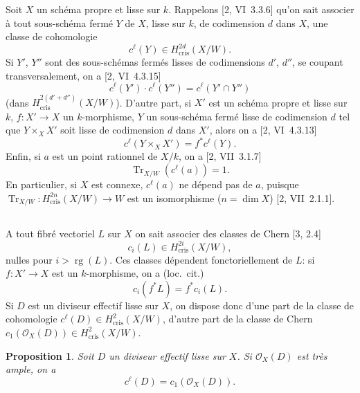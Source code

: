 \documentclass[12pt,a4paper]{article}
\theoremstyle{plain}
\newtheorem{proposition}[theorem]{Proposition}
\theoremstyle{definition}
\theoremstyle{remark}
\DeclareMathOperator{\Tr}{Tr}
\DeclareMathOperator{\rg}{rg}
\newcommand{\cris}{\mathrm{cris}}
\begin{document}
Soit $X$ un schéma propre et lisse sur $k$. Rappelons [2, VI~3.3.6] qu'on sait associer à tout sous-schéma fermé $Y$ de $X$, lisse sur $k$, de codimension $d$ dans $X$, une classe de cohomologie
\begin{equation}\label{eq:3.1.1}
c^{\ell}(Y) \in H^{2d}_{\cris}(X/W).
\end{equation}
Si $Y'$, $Y''$ sont des sous-schémas fermés lisses de codimensions $d'$, $d''$, se coupant transversalement, on a [2, VI~4.3.15]
\begin{equation}\label{eq:3.1.2}
c^{\ell}(Y') \cdot c^{\ell}(Y'') = c^{\ell}(Y' \cap Y'')
\end{equation}
(dans $H^{2(d'+d'')}_{\cris}(X/W)$). D'autre part, si $X'$ est un schéma propre et lisse sur $k$, $f: X' \to X$ un $k$-morphisme, $Y$ un sous-schéma fermé lisse de codimension $d$ tel que $Y \times_X X'$ soit lisse de codimension $d$ dans $X'$, alors on a [2, VI~4.3.13]
\begin{equation}\label{eq:3.1.3}
c^{\ell}(Y \times_X X') = f^* c^{\ell}(Y).
\end{equation}
Enfin, si $a$ est un point rationnel de $X/k$, on a [2, VII~3.1.7]
\begin{equation}\label{eq:3.1.4}
\Tr_{X/W}(c^{\ell}(a)) = 1.
\end{equation}
En particulier, si $X$ est connexe, $c^{\ell}(a)$ ne dépend pas de $a$, puisque $\Tr_{X/W}: H^{2n}_{\cris}(X/W) \to W$ est un isomorphisme ($n = \dim X$) [2, VII~2.1.1].

\subsection{}

A tout fibré vectoriel $L$ sur $X$ on sait associer des classes de Chern [3, 2.4]
\begin{equation}\label{eq:3.2.1}
c_i(L) \in H^{2i}_{\cris}(X/W),
\end{equation}
nulles pour $i > \rg(L)$. Ces classes dépendent fonctoriellement de $L$: si $f: X' \to X$ est un $k$-morphisme, on a (loc.~cit.)
\begin{equation}\label{eq:3.2.2}
c_i(f^* L) = f^* c_i(L).
\end{equation}
Si $D$ est un diviseur effectif lisse sur $X$, on dispose donc d'une part de la classe de cohomologie $c^{\ell}(D) \in H^2_{\cris}(X/W)$, d'autre part de la classe de Chern $c_1(\mathcal{O}_X(D)) \in H^2_{\cris}(X/W)$.

\begin{proposition}\label{prop:3.2.3}
Soit $D$ un diviseur effectif lisse sur $X$. Si $\mathcal{O}_X(D)$ est très ample, on a
\begin{equation}\label{eq:3.2.3.1}
c^{\ell}(D) = c_1(\mathcal{O}_X(D)).
\end{equation}
\end{proposition}
\end{document}
